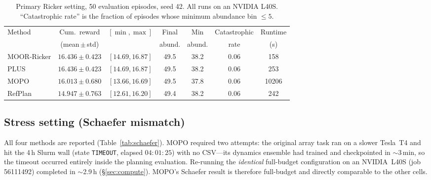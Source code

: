 \documentclass[11pt]{article}
\begin{document}
\begin{table}[h]
\centering
\small
\begin{tabular}{lcccccc}
\toprule
Method & Cum.\ reward & $[\min,\max]$ & Final & Min & Catastrophic & Runtime \\
       & (mean\,$\pm$\,std) &        & abund. & abund. & rate & (s) \\
\midrule
MOOR-Ricker & $16.436 \pm 0.423$ & $[14.69, 16.87]$ & 49.5 & 38.2 & 0.06 & 158 \\
PLUS        & $16.436 \pm 0.423$ & $[14.69, 16.87]$ & 49.5 & 38.2 & 0.06 & 253 \\
MOPO        & $16.013 \pm 0.680$ & $[13.66, 16.69]$ & 49.5 & 37.8 & 0.06 & 10206 \\
RefPlan     & $14.947 \pm 0.763$ & $[12.61, 16.20]$ & 49.4 & 38.2 & 0.06 & 242 \\
\bottomrule
\end{tabular}
\caption{Primary Ricker setting, 50 evaluation episodes, seed 42. All runs on an
NVIDIA L40S. ``Catastrophic rate'' is the fraction of episodes whose minimum
abundance bin $\le 5$.}
\label{tab:ricker}
\end{table}

\subsection{Stress setting (Schaefer mismatch)}
All four methods are reported (Table~\ref{tab:schaefer}). MOPO required two
attempts: the original array task ran on a slower Tesla~T4 and hit the 4\,h Slurm
wall (state \texttt{TIMEOUT}, elapsed $04{:}01{:}25$) with no CSV---its dynamics
ensemble had trained and checkpointed in $\sim$3\,min, so the timeout occurred
entirely inside the planning evaluation. Re-running the \emph{identical}
full-budget configuration on an NVIDIA~L40S (job 56111492) completed in
$\sim$2.9\,h (\S\ref{sec:compute}). MOPO's Schaefer result is therefore full-budget
and directly comparable to the other cells.
\end{document}
